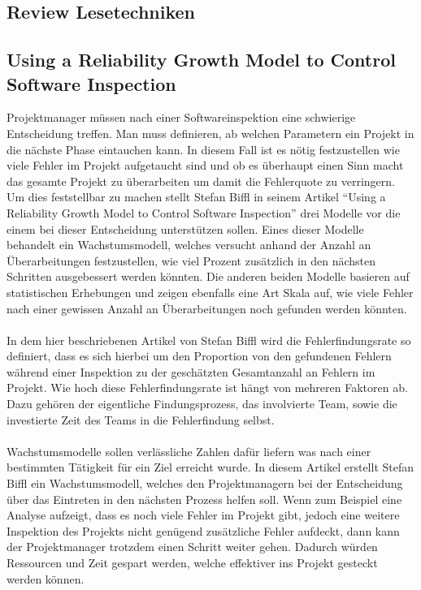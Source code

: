 \documentclass{llncs}
\begin{document}
\subsection{Review Lesetechniken}

\subsection{Using a Reliability Growth Model to Control Software Inspection}

Projektmanager müssen nach einer Softwareinspektion eine schwierige Entscheidung treffen. Man muss definieren, ab welchen Parametern ein Projekt in die nächste Phase eintauchen kann. In diesem Fall ist es nötig festzustellen wie viele Fehler im Projekt aufgetaucht sind und ob es überhaupt einen Sinn macht das gesamte Projekt zu überarbeiten um damit die Fehlerquote zu verringern. Um dies feststellbar zu machen stellt Stefan Biffl in seinem Artikel “Using a Reliability Growth Model to Control Software Inspection” drei Modelle vor die einem bei dieser Entscheidung unterstützen sollen. Eines dieser Modelle behandelt ein Wachstumsmodell, welches versucht anhand der Anzahl an Überarbeitungen festzustellen, wie viel Prozent zusätzlich in den nächsten Schritten ausgebessert werden könnten. Die anderen beiden Modelle basieren auf statistischen Erhebungen und zeigen ebenfalls eine Art Skala auf, wie viele Fehler nach einer gewissen Anzahl an Überarbeitungen noch gefunden werden könnten.
\\ \\
In dem hier beschriebenen Artikel von Stefan Biffl wird die Fehlerfindungsrate so definiert, dass es sich hierbei um den Proportion von den gefundenen Fehlern während einer Inspektion zu der geschätzten Gesamtanzahl an Fehlern im Projekt. Wie hoch diese Fehlerfindungsrate ist hängt von mehreren Faktoren ab. Dazu gehören der eigentliche Findungsprozess, das involvierte Team, sowie die investierte Zeit des Teams in die Fehlerfindung selbst.
\\ \\
Wachstumsmodelle sollen verlässliche Zahlen dafür liefern was nach einer bestimmten Tätigkeit für ein Ziel erreicht wurde. In diesem Artikel erstellt Stefan Biffl ein Wachstumsmodell, welches den Projektmanagern bei der Entscheidung über das Eintreten in den nächsten Prozess helfen soll. Wenn zum Beispiel eine Analyse aufzeigt, dass es noch viele Fehler im Projekt gibt, jedoch eine weitere Inspektion des Projekts nicht genügend zusätzliche Fehler aufdeckt, dann kann der Projektmanager trotzdem einen Schritt weiter gehen. Dadurch würden Ressourcen und Zeit gespart werden, welche effektiver ins Projekt gesteckt werden können.
\end{document}
